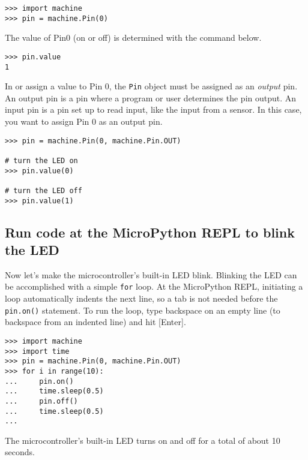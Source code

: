 \documentclass{book}
\newcommand{\passthrough}[1]{#1}
\begin{document}
\begin{lstlisting}
>>> import machine
>>> pin = machine.Pin(0)
\end{lstlisting}

The value of Pin0 (on or off) is determined with the command below.

\begin{lstlisting}
>>> pin.value
1
\end{lstlisting}

In or assign a value to Pin 0, the \passthrough{\lstinline!Pin!} object
must be assigned as an \emph{output} pin. An output pin is a pin where a
program or user determines the pin output. An input pin is a pin set up
to read input, like the input from a sensor. In this case, you want to
assign Pin 0 as an output pin.

\begin{lstlisting}
>>> pin = machine.Pin(0, machine.Pin.OUT)

# turn the LED on
>>> pin.value(0)

# turn the LED off
>>> pin.value(1)
\end{lstlisting}
    




    
        \hypertarget{run-code-at-the-micropython-repl-to-blink-the-led}{%
\subsection{Run code at the MicroPython REPL to blink the
LED}\label{run-code-at-the-micropython-repl-to-blink-the-led}}
    




    
        Now let's make the microcontroller's built-in LED blink. Blinking the
LED can be accomplished with a simple \passthrough{\lstinline!for!}
loop. At the MicroPython REPL, initiating a loop automatically indents
the next line, so a tab is not needed before the
\passthrough{\lstinline!pin.on()!} statement. To run the loop, type
backspace on an empty line (to backspace from an indented line) and hit
{[}Enter{]}.

\begin{lstlisting}
>>> import machine
>>> import time
>>> pin = machine.Pin(0, machine.Pin.OUT)
>>> for i in range(10):
...     pin.on()
...     time.sleep(0.5)
...     pin.off()
...     time.sleep(0.5)
...
\end{lstlisting}

The microcontroller's built-in LED turns on and off for a total of about
10 seconds.
    
\end{document}
